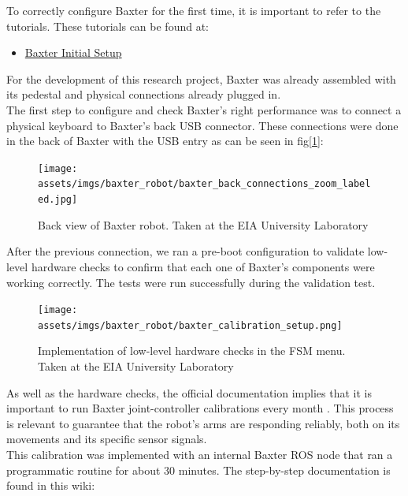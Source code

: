 \documentclass[11pt]{report} %
\begin{document}
To correctly configure Baxter for the first time, it is important to refer to the  tutorials. These tutorials can be found at:

\begin{itemize}
    \color{blue}
    \item \href{https://sdk.rethinkrobotics.com/wiki/Getting_Started}{Baxter Initial Setup}
\end{itemize}

For the development of this research project, Baxter was already assembled with its pedestal and physical connections already plugged in.\\

The first step to configure and check Baxter's right performance was to connect a physical keyboard to Baxter's back USB connector. These connections were done in the back of Baxter with the USB entry as can be seen in fig[\ref{fig_baxter_back_part_closeup}]:\\


\begin{figure}[H]
    \centering
    \texttt{[image: assets/imgs/baxter\_robot/baxter\_back\_connections\_zoom\_labeled.jpg]}
    \caption{Back view of Baxter robot. Taken at the EIA University Laboratory} 
    \label{fig_baxter_back_part_closeup}
\end{figure}


After the previous connection, we ran a pre-boot configuration to validate low-level hardware checks to confirm that each one of Baxter's components were working correctly. The tests were run successfully during the validation test.\\

\begin{figure}[H]
    \centering
    \texttt{[image: assets/imgs/baxter\_robot/baxter\_calibration\_setup.png]}
    \caption{Implementation of low-level hardware checks in the FSM menu. Taken at the EIA University Laboratory} 
    \label{fig_low_level_checks_fsm}
\end{figure}


As well as the hardware checks, the official documentation implies that it is important to run Baxter joint-controller calibrations every month \citep{cite_baxter_arms_calibartion}. This process is relevant to guarantee that the robot's arms are responding reliably, both on its movements and its specific sensor signals.\\

This calibration was implemented with an internal Baxter ROS node that ran a programmatic routine for about 30 minutes. The step-by-step documentation is found in this wiki:
\end{document}
